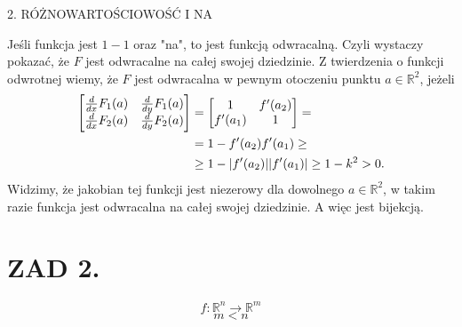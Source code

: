 \documentclass{article}[13pt]
\newcommand{\R}{\mathds{R}}
\begin{document}



{\color{red}2. RÓŻNOWARTOŚCIOWOŚĆ I NA}
\medskip

{\color{gr}Jeśli funkcja jest $1-1$ oraz "na", to jest funkcją odwracalną. Czyli wystaczy pokazać, że $F$ jest odwracalne na całej swojej dziedzinie. Z twierdzenia o funkcji odwrotnej wiemy, że $F$ jest odwracalna w pewnym otoczeniu punktu $a\in\R^2$, jeżeli
\begin{align*}\begin{bmatrix}
    {d\over dx}F_1(a) & {d\over dy}F_1(a)\\
    {d\over dx}F_2(a) & {d\over dy}F_2(a)
\end{bmatrix}&=
\begin{bmatrix}
    1 & f'(a_2)\\
    f'(a_1) & 1
\end{bmatrix}=\\
&=1-f'(a_2)f'(a_1)\geq\\
&\geq 1-|f'(a_2)||f'(a_1)|\geq 1-k^2>0.
\end{align*}
Widzimy, że jakobian tej funkcji jest niezerowy dla dowolnego $a\in\R^2$, w takim razie funkcja jest odwracalna na całej swojej dziedzinie. A więc jest bijekcją.}


\section*{ZAD 2.}

$$f:\R^n\to\R^m$$
$$m<n$$
\end{document}
